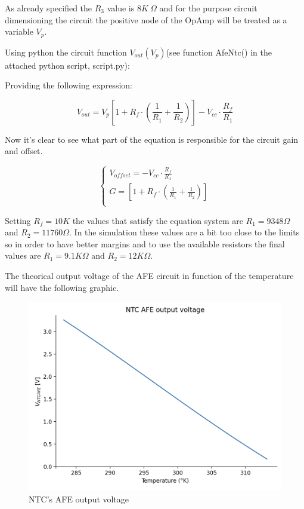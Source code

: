 \documentclass[12pt]{article}
\begin{document}
    As already specified the $R_3$ value is $8K~\Omega$ and for the purpose circuit dimensioning the circuit 
    the positive node of the OpAmp will be treated as a variable $V_p$.

    Using python the circuit function $V_{out}(V_p)$(see function AfeNtc() in the attached python script, script.py): 

       
    Providing the following expression:

    \begin{equation}
        V_{out} = V_p\left[ 1 + R_f\cdot\left(\frac{1}{R_1} + \frac{1}{R_2}\right) \right] - V_{cc}\cdot\frac{R_f}{R_1}
    \end{equation}

    Now it's clear to see what part of the equation is responsible for the circuit gain and offset.
    
    \begin{equation}
        \begin{cases}
            V_{offset} = - V_{cc}\cdot\frac{R_f}{R_1}\\
            G = \left[ 1 + R_f\cdot\left(\frac{1}{R_1} + \frac{1}{R_2}\right) \right]\\
        \end{cases}
    \end{equation}

    Setting $R_f = 10K$ the values that satisfy the equation system are $R_1 = 9348 \Omega$ and $R_2 = 11760 \Omega$.
    In the simulation these values are a bit too close to the limits so in order to have better margins and to use the available resistors
    the final values are  $R_1 = 9.1K \Omega$ and $R_2 = 12K \Omega$.

    The theorical output voltage of the AFE circuit in function of the temperature will have the
    following graphic.
    \begin{figure}[H] 
        \centering
        \includegraphics*[scale = 0.6]{images/outuptafentc.png}
        \caption{NTC's AFE output voltage}
        \label{NTCAFEgraph}
    \end{figure}
\end{document}
